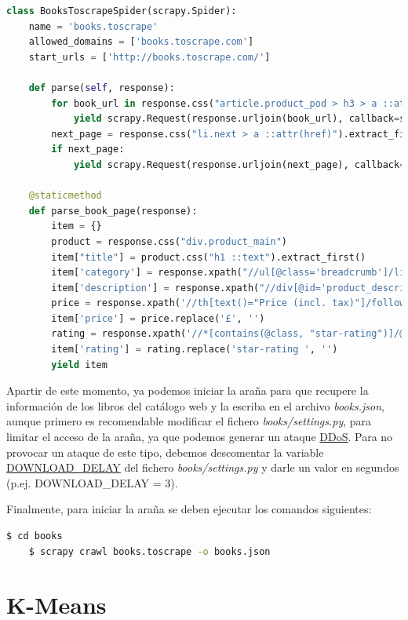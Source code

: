 \documentclass{uimppracticas}
\begin{document}
\begin{lstlisting}[language=python]
class BooksToscrapeSpider(scrapy.Spider):
	name = 'books.toscrape'
	allowed_domains = ['books.toscrape.com']
	start_urls = ['http://books.toscrape.com/']
	
	def parse(self, response):
		for book_url in response.css("article.product_pod > h3 > a ::attr(href)").extract():
			yield scrapy.Request(response.urljoin(book_url), callback=self.parse_book_page)
		next_page = response.css("li.next > a ::attr(href)").extract_first()
		if next_page:
			yield scrapy.Request(response.urljoin(next_page), callback=self.parse)
	
	@staticmethod
	def parse_book_page(response):
		item = {}
		product = response.css("div.product_main")
		item["title"] = product.css("h1 ::text").extract_first()
		item['category'] = response.xpath("//ul[@class='breadcrumb']/li[@class='active']/preceding-sibling::li[1]/a/text()").extract_first()
		item['description'] = response.xpath("//div[@id='product_description']/following-sibling::p/text()").extract_first()
		price = response.xpath('//th[text()="Price (incl. tax)"]/following-sibling::td/text()').extract_first()
		item['price'] = price.replace('£', '')
		rating = response.xpath('//*[contains(@class, "star-rating")]/@class').extract_first()
		item['rating'] = rating.replace('star-rating ', '')
		yield item
\end{lstlisting}

Apartir de este momento, ya podemos iniciar la araña para que recupere la información de los libros del catálogo web y la escriba en el archivo \textit{books.json}, aunque primero es recomendable modificar el fichero \textit{books/settings.py}, para limitar el acceso de la araña, ya que podemos generar un ataque \href{https://es.wikipedia.org/wiki/Ataque\_de\_denegaci\%C3\%B3n_de_servicio}{DDoS}. Para no provocar un ataque de este tipo, debemos descomentar la variable \href{https://docs.scrapy.org/en/latest/topics/settings.html#download-delay}{DOWNLOAD\_DELAY} del fichero \textit{books/settings.py}  y darle un valor en segundos (p.ej. DOWNLOAD\_DELAY = 3). 
	
Finalmente, para iniciar la araña se deben ejecutar los comandos siguientes:	
	
\begin{lstlisting}[language=bash]
	$ cd books
	$ scrapy crawl books.toscrape -o books.json
\end{lstlisting}

\section{K-Means}\label{kmeans} 
\end{document}
